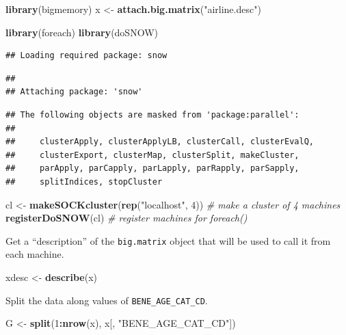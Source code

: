 \documentclass[]{book}
\newenvironment{Shaded}{\begin{snugshade}}{\end{snugshade}}
\newcommand{\CommentTok}[1]{\textcolor[rgb]{0.56,0.35,0.01}{\textit{#1}}}
\newcommand{\DecValTok}[1]{\textcolor[rgb]{0.00,0.00,0.81}{#1}}
\newcommand{\KeywordTok}[1]{\textcolor[rgb]{0.13,0.29,0.53}{\textbf{#1}}}
\newcommand{\NormalTok}[1]{#1}
\newcommand{\OperatorTok}[1]{\textcolor[rgb]{0.81,0.36,0.00}{\textbf{#1}}}
\newcommand{\StringTok}[1]{\textcolor[rgb]{0.31,0.60,0.02}{#1}}
\theoremstyle{definition}
\theoremstyle{definition}
\theoremstyle{definition}
\theoremstyle{remark}
\begin{document}
\begin{Shaded}
\begin{Highlighting}[]
\KeywordTok{library}\NormalTok{(bigmemory)}
\NormalTok{x <-}\StringTok{ }\KeywordTok{attach.big.matrix}\NormalTok{(}\StringTok{"airline.desc"}\NormalTok{)}

\KeywordTok{library}\NormalTok{(foreach)}
\KeywordTok{library}\NormalTok{(doSNOW)}
\end{Highlighting}
\end{Shaded}

\begin{verbatim}
## Loading required package: snow
\end{verbatim}

\begin{verbatim}
## 
## Attaching package: 'snow'
\end{verbatim}

\begin{verbatim}
## The following objects are masked from 'package:parallel':
## 
##     clusterApply, clusterApplyLB, clusterCall, clusterEvalQ,
##     clusterExport, clusterMap, clusterSplit, makeCluster,
##     parApply, parCapply, parLapply, parRapply, parSapply,
##     splitIndices, stopCluster
\end{verbatim}

\begin{Shaded}
\begin{Highlighting}[]
\NormalTok{cl <-}\StringTok{ }\KeywordTok{makeSOCKcluster}\NormalTok{(}\KeywordTok{rep}\NormalTok{(}\StringTok{"localhost"}\NormalTok{, }\DecValTok{4}\NormalTok{)) }\CommentTok{# make a cluster of 4 machines}
\KeywordTok{registerDoSNOW}\NormalTok{(cl) }\CommentTok{# register machines for foreach()}
\end{Highlighting}
\end{Shaded}

Get a ``description'' of the \texttt{big.matrix} object that will be used to call it from each machine.

\begin{Shaded}
\begin{Highlighting}[]
\NormalTok{xdesc <-}\StringTok{ }\KeywordTok{describe}\NormalTok{(x) }
\end{Highlighting}
\end{Shaded}

Split the data along values of \texttt{BENE\_AGE\_CAT\_CD}.

\begin{Shaded}
\begin{Highlighting}[]
\NormalTok{G <-}\StringTok{ }\KeywordTok{split}\NormalTok{(}\DecValTok{1}\OperatorTok{:}\KeywordTok{nrow}\NormalTok{(x), x[, }\StringTok{"BENE_AGE_CAT_CD"}\NormalTok{]) }
\end{Highlighting}
\end{Shaded}
\end{document}
